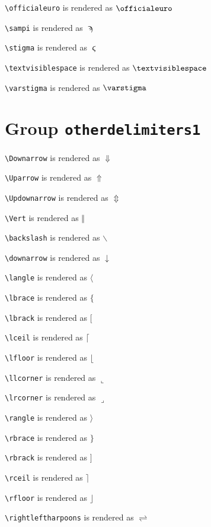 \texttt{\textbackslash officialeuro} is rendered as $\officialeuro$

\texttt{\textbackslash sampi} is rendered as $\sampi$

\texttt{\textbackslash stigma} is rendered as $\stigma$

\texttt{\textbackslash textvisiblespace} is rendered as $\textvisiblespace$

\texttt{\textbackslash varstigma} is rendered as $\varstigma$

\section{ Group \texttt{other\textunderscore delimiters1}}

\texttt{\textbackslash Downarrow} is rendered as $\Downarrow$

\texttt{\textbackslash Uparrow} is rendered as $\Uparrow$

\texttt{\textbackslash Updownarrow} is rendered as $\Updownarrow$

\texttt{\textbackslash Vert} is rendered as $\Vert$

\texttt{\textbackslash backslash} is rendered as $\backslash$

\texttt{\textbackslash downarrow} is rendered as $\downarrow$

\texttt{\textbackslash langle} is rendered as $\langle$

\texttt{\textbackslash lbrace} is rendered as $\lbrace$

\texttt{\textbackslash lbrack} is rendered as $\lbrack$

\texttt{\textbackslash lceil} is rendered as $\lceil$

\texttt{\textbackslash lfloor} is rendered as $\lfloor$

\texttt{\textbackslash llcorner} is rendered as $\llcorner$

\texttt{\textbackslash lrcorner} is rendered as $\lrcorner$

\texttt{\textbackslash rangle} is rendered as $\rangle$

\texttt{\textbackslash rbrace} is rendered as $\rbrace$

\texttt{\textbackslash rbrack} is rendered as $\rbrack$

\texttt{\textbackslash rceil} is rendered as $\rceil$

\texttt{\textbackslash rfloor} is rendered as $\rfloor$

\texttt{\textbackslash rightleftharpoons} is rendered as $\rightleftharpoons$

